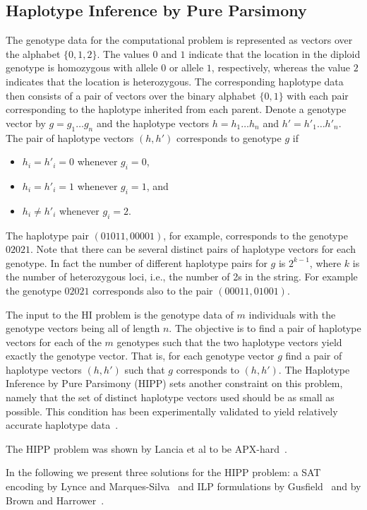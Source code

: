 \documentclass[12pt,a4paper]{article}
\begin{document}
\subsection{Haplotype Inference by Pure Parsimony}
The genotype data for the computational problem is represented as vectors over the alphabet $\{0, 1, 2\}$. 
The values $0$ and $1$ indicate that the location in the diploid genotype is homozygous with allele $0$ or allele $1$, respectively, 
whereas the value $2$ indicates that the location is heterozygous.
The corresponding haplotype data then consists of a pair of vectors over the binary alphabet $\{0, 1\}$ with each pair corresponding to the haplotype inherited from each parent.
Denote a genotype vector by $g=g_1\dots g_n$ and the haplotype vectors $h=h_1\dots h_n$ and $h'=h'_1\dots h'_n$.
The pair of haplotype vectors $(h, h')$ corresponds to genotype $g$ if 
\begin{itemize}
\item $h_i=h'_i=0$ whenever $g_i = 0$,
\item $h_i=h'_i=1$ whenever $g_i = 1$, and
\item $h_i \neq h'_i$ whenever $g_i = 2$.
\end{itemize}
The haplotype pair $(01011, 00001)$, for example, corresponds to the genotype $02021$.
Note that there can be several distinct pairs of haplotype vectors for each genotype.
In fact the number of different haplotype pairs for $g$ is $2^{k-1}$, where $k$ is the number of heterozygous loci, i.e., the number of 2s in the string.
For example the genotype $02021$ corresponds also to the pair $(00011, 01001)$.

The input to the HI problem is the genotype data of $m$ individuals with the genotype vectors being all of length $n$.
The objective is to find a pair of haplotype vectors for each of the $m$ genotypes such that the two haplotype vectors yield exactly the genotype vector.
That is, for each genotype vector $g$ find a pair of haplotype vectors $(h, h')$ such that $g$ corresponds to $(h, h')$.
The Haplotype Inference by Pure Parsimony (HIPP) sets another constraint on this problem, namely that the set of distinct haplotype vectors used should be as small as possible.
This condition has been experimentally validated to yield relatively accurate haplotype data~\cite{DBLP:journals/bioinformatics/WangX03a}.

The HIPP problem was shown by Lancia et al to be APX-hard~\cite{DBLP:journals/informs/LanciaPR04}.

In the following we present three solutions for the HIPP problem: a SAT encoding by Lynce and Marques-Silva~\cite{DBLP:conf/aaai/LynceM06} and ILP formulations by Gusfield~\cite{DBLP:conf/cpm/Gusfield03} and by Brown and Harrower~\cite{DBLP:journals/tcbb/BrownH06}.
\end{document}
